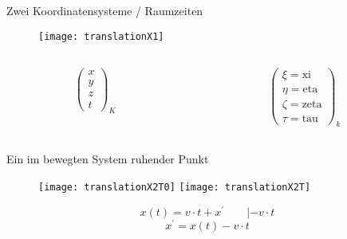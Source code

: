 \documentclass[]{beamer}%
\begin{document}
\begin{frame}{Zwei Koordinatensysteme / Raumzeiten}
    \begin{figure}[h]
        \centering
        \texttt{[image: translationX1]}
    \end{figure}
    \begin{columns}
        \begin{column}{0.5\textwidth}
            \begin{align*}
                \begin{pmatrix}
                    x\\y\\z\\t
                \end{pmatrix}_{K}
            \end{align*}
        \end{column}
        \begin{column}{0.5\textwidth}
            \begin{align*}
                \begin{pmatrix}
                    \xi = \text{xi}\\ 
                    \eta = \text{eta}\\ 
                    \zeta =\text{zeta}\\ 
                    \tau = \text{tau}
                \end{pmatrix}_{k}
            \end{align*}
        \end{column}
    \end{columns}
\end{frame}

\begin{frame}{Ein im bewegten System ruhender Punkt}
    \begin{figure}[h]
        \centering
        \texttt{[image: translationX2T0]}
        \hspace{30pt}
        \texttt{[image: translationX2T]}
    \end{figure}
    \begin{equation*}
        x(t)        = v\cdot t + x^\prime \quad \quad| -v \cdot t 
    \end{equation*}
    \begin{equation*}
        \boxed{
            x^\prime    = x(t) - v \cdot t
        }
    \end{equation*}
\end{frame}
\end{document}
